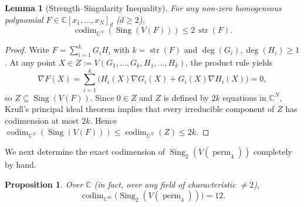 \documentclass[11pt,a4paper]{article}
\newtheorem{lemma}[theorem]{Lemma}
\newtheorem{proposition}[theorem]{Proposition}
\theoremstyle{definition}
\DeclareMathOperator{\perm}{perm}
\DeclareMathOperator{\codim}{codim}
\DeclareMathOperator{\Sing}{Sing}
\DeclareMathOperator{\str}{str}
\begin{document}
\begin{lemma}[Strength--Singularity Inequality]\label{lem:strength}
For any non-zero homogeneous polynomial $F \in \mathbb{C}[x_1,\dots,x_N]_d$ ($d \ge 2$),
\[
  \codim_{\mathbb{C}^N}(\Sing(V(F))) \le 2\,\str(F).
\]
\end{lemma}

\begin{proof}
Write $F = \sum_{i=1}^k G_i H_i$ with $k = \str(F)$ and $\deg(G_i), \deg(H_i) \ge 1$. At any point $X \in Z := V(G_1,\dots,G_k, H_1,\dots,H_k)$, the product rule yields
\[
  \nabla F(X) = \sum_{i=1}^k \big(H_i(X)\nabla G_i(X) + G_i(X)\nabla H_i(X)\big) = 0,
\]
so $Z \subseteq \Sing(V(F))$. Since $0 \in Z$ and $Z$ is defined by $2k$ equations in $\mathbb{C}^N$, Krull's principal ideal theorem implies that every irreducible component of $Z$ has codimension at most $2k$. Hence $\codim_{\mathbb{C}^N}(\Sing(V(F))) \le \codim_{\mathbb{C}^N}(Z) \le 2k$.
\end{proof}

We next determine the exact codimension of $\Sing_2(V(\perm_4))$ completely by hand.

\begin{proposition}\label{prop:sing2}
Over $\mathbb{C}$ (in fact, over any field of characteristic $\neq 2$),
\[
  \codim_{\mathbb{C}^{16}}\big(\Sing_2(V(\perm_4))\big) = 12.
\]
\end{proposition}
\end{document}
